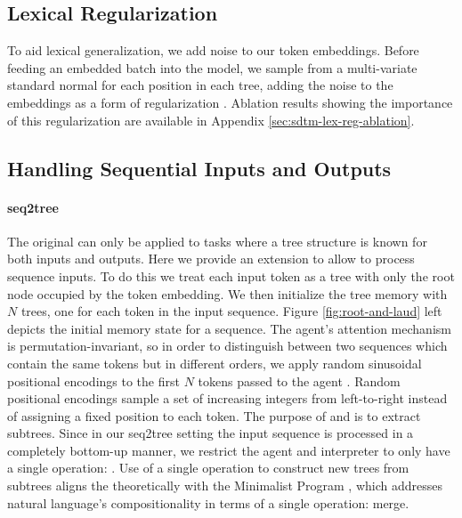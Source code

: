 \subsection{Lexical Regularization} \label{sec:sdtm-lex-reg}
To aid lexical generalization, we add noise to our token embeddings. Before feeding an embedded batch into the model, we sample from a multi-variate standard normal for each position in each tree, adding the noise to the embeddings as a form of regularization \citep{bishop-noise}. Ablation results showing the importance of this regularization are available in Appendix \ref{sec:sdtm-lex-reg-ablation}. %


\subsection{Handling Sequential Inputs and Outputs}\label{sec:sdtm-seq2tree}
\paragraph{seq2tree} The original \dtm can only be applied to tasks where a tree structure is known for both inputs and outputs. Here we provide an extension to allow \dtm to process sequence inputs. To do this we treat each input token as a tree with only the root node occupied by the token embedding. We then initialize the tree memory with $N$ trees, one for each token in the input sequence. Figure \ref{fig:root-and-laud} left depicts the initial memory state for a sequence. The agent's attention mechanism is permutation-invariant, so in order to distinguish between two sequences which contain the same tokens but in different orders, we apply random sinusoidal positional encodings to the first $N$ tokens passed to the agent \citep{li2023representations, ruoss-etal-2023-randomized}. Random positional encodings sample a set of increasing integers from left-to-right instead of assigning a fixed position to each token. The purpose of \leftcommand and \rightcommand is to extract subtrees. Since in our seq2tree setting the input sequence is processed in a completely bottom-up manner, we restrict the agent and interpreter to only have a single operation: \cons. Use of a single operation to construct new trees from subtrees aligns the \dtm theoretically with the Minimalist Program \citep{10.7551/mitpress/9780262527347.001.0001}, which addresses natural language's compositionality in terms of a single operation: merge.
